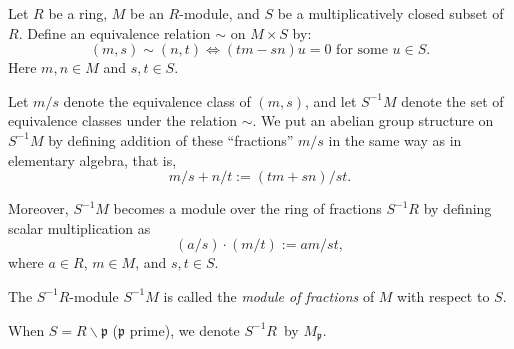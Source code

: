     \begin{definition}
        Let \(R\) be a ring, \(M\) be an \(R\)-module, and \(S\) be a multiplicatively closed subset of \(R\). Define an equivalence relation \(\sim\) on \(M \times S\) by:
        \[
            (m,s) \sim (n,t) \iff (tm-sn)u=0 \text{ for some } u \in S.
        \]
        Here \(m,n \in M\) and \(s,t \in S\).

        Let \(m/s\) denote the equivalence class of \((m,s)\), and let \(S^{-1}M\) denote the set of equivalence classes under the relation \(\sim\). We put an abelian group structure on \(S^{-1}M\) by defining addition of these ``fractions'' \(m/s\) in the same way as in elementary algebra, that is,
        \[
        m/s+n/t := (tm+sn)/st.
        \]

        Moreover, \(S^{-1}M\) becomes a module over the ring of fractions \(S^{-1}R\) by defining scalar multiplication as
        \[
        (a/s)\cdot(m/t):=am/st,
        \]
        where \(a \in R\), \(m \in M\), and \(s,t \in S\).

        The \(S^{-1}R\)-module \(S^{-1}M\) is called the \emph{module of fractions} of \(M\) with respect to \(S\).
    \end{definition}
    When \( S = R \smallsetminus \mathfrak{p} \) (\( \mathfrak{p} \) prime), we denote \( S^{-1}R \) by \( M_\mathfrak{p} \).

